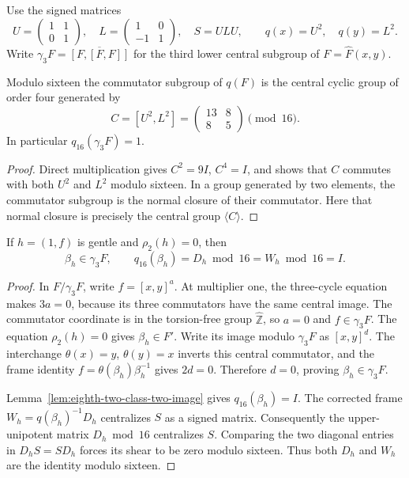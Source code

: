 Use the signed matrices
\[
 U=\begin{pmatrix}1&1\\0&1\end{pmatrix},\quad
 L=\begin{pmatrix}1&0\\-1&1\end{pmatrix},\quad S=ULU,
 \qquad q(x)=U^2,\quad q(y)=L^2.
\]
Write $\gamma_3F=\overline{[F,[F,F]]}$ for the third lower
central subgroup of $F=\widehat F(x,y)$.

\begin{lemma}\label{lem:eighth-two-class-two-image}
Modulo sixteen the commutator subgroup of $q(F)$ is the central
cyclic group of order four generated by
\[
 C=[U^2,L^2]
   =\begin{pmatrix}13&8\\8&5\end{pmatrix}\pmod{16}.
\]
In particular $q_{16}(\gamma_3F)=1$.
\end{lemma}

\begin{proof}
Direct multiplication gives $C^2=9I$, $C^4=I$, and shows that
$C$ commutes with both $U^2$ and $L^2$ modulo sixteen.
In a group generated by two elements, the commutator subgroup
is the normal closure of their commutator.  Here that normal
closure is precisely the central group $\langle C\rangle$.
\end{proof}

\begin{lemma}\label{lem:eighth-two-normalized-gentle}
If $h=(1,f)$ is gentle and $\rho_2(h)=0$, then
\[
 \beta_h\in\gamma_3F,\qquad
 q_{16}(\beta_h)=D_h\bmod16=W_h\bmod16=I.
\]
\end{lemma}

\begin{proof}
In $F/\gamma_3F$, write $f=[x,y]^a$.
At multiplier one, the three-cycle equation makes $3a=0$,
because its three commutators have the same central image.
The commutator coordinate is in the torsion-free group
$\widehat{\mathbb Z}$, so $a=0$ and $f\in\gamma_3F$.
The equation $\rho_2(h)=0$ gives $\beta_h\in F'$.
Write its image modulo $\gamma_3F$ as $[x,y]^d$.
The interchange $\theta(x)=y$, $\theta(y)=x$ inverts this
central commutator, and the frame identity
$f=\theta(\beta_h)\beta_h^{-1}$ gives $2d=0$.
Therefore $d=0$, proving $\beta_h\in\gamma_3F$.

Lemma~\ref{lem:eighth-two-class-two-image} gives
$q_{16}(\beta_h)=I$.  The corrected frame
$W_h=q(\beta_h)^{-1}D_h$ centralizes $S$ as a signed matrix.
Consequently the upper-unipotent matrix $D_h\bmod16$ centralizes
$S$.  Comparing the two diagonal entries in $D_hS=SD_h$
forces its shear to be zero modulo sixteen.  Thus both $D_h$
and $W_h$ are the identity modulo sixteen.
\end{proof}

